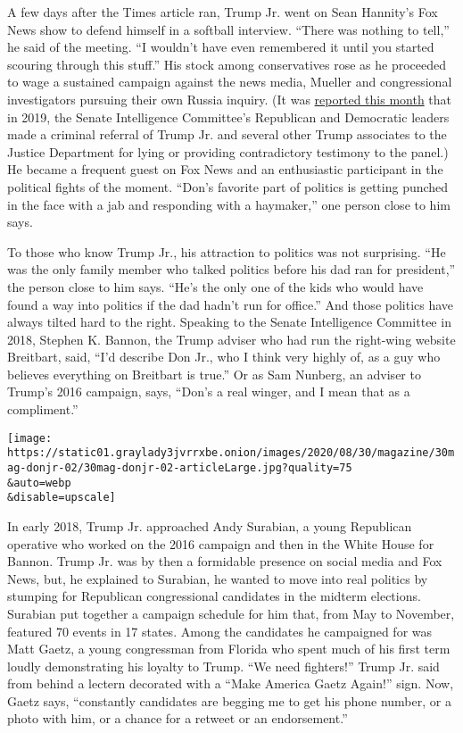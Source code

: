 A few days after the Times article ran, Trump Jr. went on Sean Hannity's
Fox News show to defend himself in a softball interview. ``There was
nothing to tell,'' he said of the meeting. ``I wouldn't have even
remembered it until you started scouring through this stuff.'' His stock
among conservatives rose as he proceeded to wage a sustained campaign
against the news media, Mueller and congressional investigators pursuing
their own Russia inquiry. (It was
\href{https://www.nbcnews.com/politics/justice-department/senate-made-criminal-referral-trump-jr-bannon-kushner-two-others-n1237155}{reported
this month} that in 2019, the Senate Intelligence Committee's Republican
and Democratic leaders made a criminal referral of Trump Jr. and several
other Trump associates to the Justice Department for lying or providing
contradictory testimony to the panel.) He became a frequent guest on Fox
News and an enthusiastic participant in the political fights of the
moment. ``Don's favorite part of politics is getting punched in the face
with a jab and responding with a haymaker,'' one person close to him
says.

To those who know Trump Jr., his attraction to politics was not
surprising. ``He was the only family member who talked politics before
his dad ran for president,'' the person close to him says. ``He's the
only one of the kids who would have found a way into politics if the dad
hadn't run for office.'' And those politics have always tilted hard to
the right. Speaking to the Senate Intelligence Committee in 2018,
Stephen K. Bannon, the Trump adviser who had run the right-wing website
Breitbart, said, ``I'd describe Don Jr., who I think very highly of, as
a guy who believes everything on Breitbart is true.'' Or as Sam Nunberg,
an adviser to Trump's 2016 campaign, says, ``Don's a real winger, and I
mean that as a compliment.''

\texttt{[image: https://static01.graylady3jvrrxbe.onion/images/2020/08/30/magazine/30mag-donjr-02/30mag-donjr-02-articleLarge.jpg?quality=75\\\&auto=webp\\\&disable=upscale]}

In early 2018, Trump Jr. approached Andy Surabian, a young Republican
operative who worked on the 2016 campaign and then in the White House
for Bannon. Trump Jr. was by then a formidable presence on social media
and Fox News, but, he explained to Surabian, he wanted to move into real
politics by stumping for Republican congressional candidates in the
midterm elections. Surabian put together a campaign schedule for him
that, from May to November, featured 70 events in 17 states. Among the
candidates he campaigned for was Matt Gaetz, a young congressman from
Florida who spent much of his first term loudly demonstrating his
loyalty to Trump. ``We need fighters!'' Trump Jr. said from behind a
lectern decorated with a ``Make America Gaetz Again!'' sign. Now, Gaetz
says, ``constantly candidates are begging me to get his phone number, or
a photo with him, or a chance for a retweet or an endorsement.''


